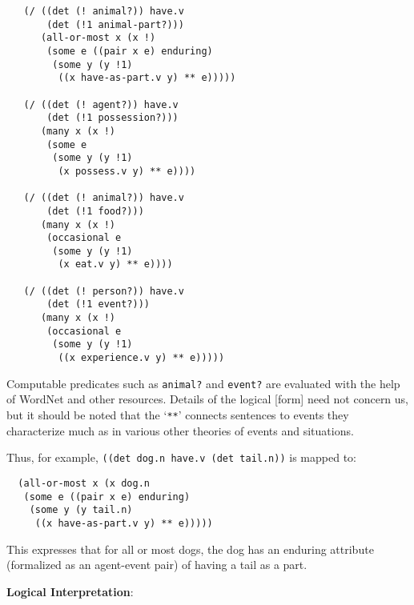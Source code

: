 \documentclass[a4,11pt]{article}
\begin{document}
\footnotesize
\begin{verbatim}
   (/ ((det (! animal?)) have.v 
       (det (!1 animal-part?)))
      (all-or-most x (x !)
       (some e ((pair x e) enduring)
        (some y (y !1)
         ((x have-as-part.v y) ** e)))))

   (/ ((det (! agent?)) have.v 
       (det (!1 possession?)))
      (many x (x !)
       (some e
        (some y (y !1)
         (x possess.v y) ** e))))

   (/ ((det (! animal?)) have.v 
       (det (!1 food?)))
      (many x (x !)
       (occasional e
        (some y (y !1)
         (x eat.v y) ** e))))

   (/ ((det (! person?)) have.v 
       (det (!1 event?)))
      (many x (x !)
       (occasional e
        (some y (y !1)
         ((x experience.v y) ** e)))))
\end{verbatim}
\normalsize
Computable predicates such as \texttt{animal?} and \texttt{event?} are evaluated with the help of WordNet and other resources. Details of the logical [form] need not concern us, but it should be noted that the `\texttt{**}' connects sentences to events they characterize much as in various other theories of events and situations.

Thus, for example, \texttt{((det dog.n have.v (det tail.n))} is mapped to:
\footnotesize
\begin{verbatim}
  (all-or-most x (x dog.n
   (some e ((pair x e) enduring)
    (some y (y tail.n)
     ((x have-as-part.v y) ** e)))))
\end{verbatim}
\normalsize

This expresses that for all or most dogs, the dog has an enduring
attribute (formalized as an agent-event pair) of having a tail as a part.


{\bf Logical Interpretation}:
\end{document}
